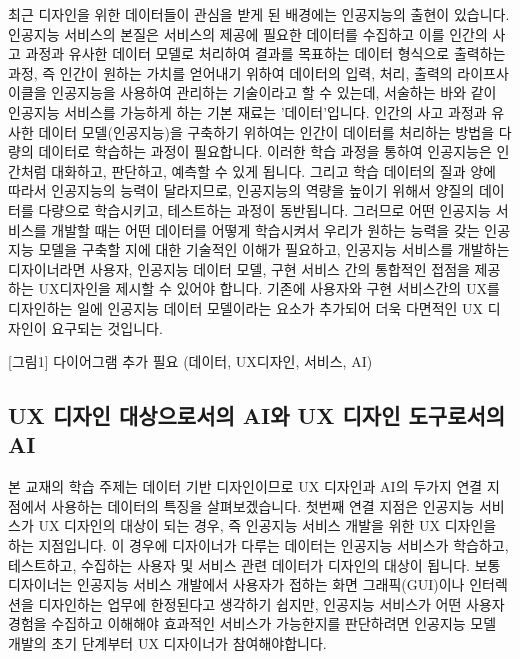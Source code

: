 \documentclass[
  letterpaper,
  DIV=11,
  numbers=noendperiod]{scrreprt}
\begin{document}
최근 디자인을 위한 데이터들이 관심을 받게 된 배경에는 인공지능의 출현이
있습니다. 인공지능 서비스의 본질은 서비스의 제공에 필요한 데이터를
수집하고 이를 인간의 사고 과정과 유사한 데이터 모델로 처리하여 결과를
목표하는 데이터 형식으로 출력하는 과정, 즉 인간이 원하는 가치를 얻어내기
위하여 데이터의 입력, 처리, 출력의 라이프사이클을 인공지능을 사용하여
관리하는 기술이라고 할 수 있는데, 서술하는 바와 같이 인공지능 서비스를
가능하게 하는 기본 재료는 '데이터'입니다. 인간의 사고 과정과 유사한
데이터 모델(인공지능)을 구축하기 위하여는 인간이 데이터를 처리하는
방법을 다량의 데이터로 학습하는 과정이 필요합니다. 이러한 학습 과정을
통하여 인공지능은 인간처럼 대화하고, 판단하고, 예측할 수 있게 됩니다.
그리고 학습 데이터의 질과 양에 따라서 인공지능의 능력이 달라지므로,
인공지능의 역량을 높이기 위해서 양질의 데이터를 다량으로 학습시키고,
테스트하는 과정이 동반됩니다. 그러므로 어떤 인공지능 서비스를 개발할
때는 어떤 데이터를 어떻게 학습시켜서 우리가 원하는 능력을 갖는 인공지능
모델을 구축할 지에 대한 기술적인 이해가 필요하고, 인공지능 서비스를
개발하는 디자이너라면 사용자, 인공지능 데이터 모델, 구현 서비스 간의
통합적인 접점을 제공하는 UX디자인을 제시할 수 있어야 합니다. 기존에
사용자와 구현 서비스간의 UX를 디자인하는 일에 인공지능 데이터 모델이라는
요소가 추가되어 더욱 다면적인 UX 디자인이 요구되는 것입니다.

{[}그림1{]} 다이어그램 추가 필요 (데이터, UX디자인, 서비스, AI)

\subsection{UX 디자인 대상으로서의 AI와 UX 디자인 도구로서의
AI}\label{ux-uxb514uxc790uxc778-uxb300uxc0c1uxc73cuxb85cuxc11cuxc758-aiuxc640-ux-uxb514uxc790uxc778-uxb3c4uxad6cuxb85cuxc11cuxc758-ai}

본 교재의 학습 주제는 데이터 기반 디자인이므로 UX 디자인과 AI의 두가지
연결 지점에서 사용하는 데이터의 특징을 살펴보겠습니다. 첫번째 연결
지점은 인공지능 서비스가 UX 디자인의 대상이 되는 경우, 즉 인공지능
서비스 개발을 위한 UX 디자인을 하는 지점입니다. 이 경우에 디자이너가
다루는 데이터는 인공지능 서비스가 학습하고, 테스트하고, 수집하는 사용자
및 서비스 관련 데이터가 디자인의 대상이 됩니다. 보통 디자이너는 인공지능
서비스 개발에서 사용자가 접하는 화면 그래픽(GUI)이나 인터렉션을
디자인하는 업무에 한정된다고 생각하기 쉽지만, 인공지능 서비스가 어떤
사용자 경험을 수집하고 이해해야 효과적인 서비스가 가능한지를 판단하려면
인공지능 모델 개발의 초기 단계부터 UX 디자이너가 참여해야합니다.
\end{document}
